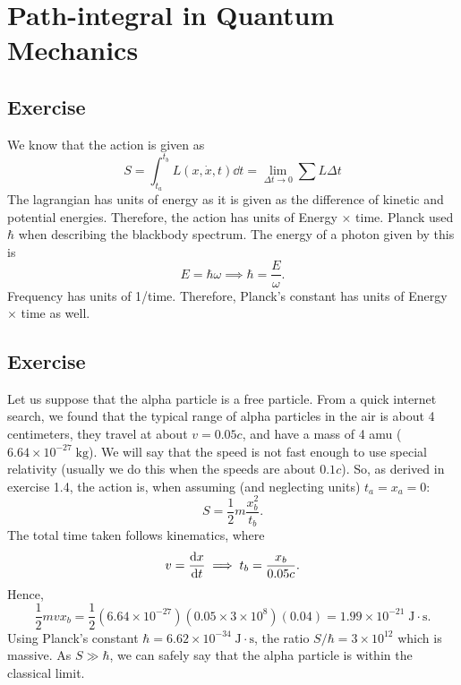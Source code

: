 \section{Path-integral in Quantum Mechanics}
\subsection{Exercise}
We know that the action is given as
\begin{equation}
    S = \int_{t_a}^{t_b}L(x, \dot x, t) \dd t = \lim_{\Delta t\to 0}\sum L \Delta t
\end{equation}
The lagrangian has units of energy as it is given as the difference of kinetic and potential energies. Therefore, the action has units of Energy $\times$ time. Planck used $\hbar$ when describing the blackbody spectrum. The energy of a photon given by this is
\begin{equation}
    E = \hbar \omega \implies \hbar = \frac{E}{\omega}.
\end{equation}
Frequency has units of 1/time. Therefore, Planck's constant has units of Energy $\times$ time as well. 
\subsection{Exercise}
Let us suppose that the alpha particle is a free particle. From a quick internet search, we found that the typical range of alpha particles in the air is about 4 centimeters, they travel at about $v = 0.05c$, and have a mass of 4 amu ($6.64\times 10^{-27}\;\mathrm{kg}$). We will say that the speed is not fast enough to use special relativity (usually we do this when the speeds are about $0.1c$). So, as derived in exercise 1.4, the action is, when assuming (and neglecting units) $t_a = x_a = 0$: 
\begin{equation}
    S = \frac{1}{2}m\frac{x_b^2}{t_b}.
\end{equation}
The total time taken follows kinematics, where 
\begin{equation}
    v = \dv{x}{t}\implies t_b = \frac{x_b}{0.05c}. 
\end{equation}
Hence, 
\begin{equation}
    \frac{1}{2}mv x_b = \frac{1}{2}(6.64\times 10^{-27}) (0.05 \times 3\times 10^8)(0.04) = 1.99\times 10^{-21}\;\mathrm{J\cdot s}.
\end{equation}
Using Planck's constant $\hbar = 6.62 \times 10^{-34}\;\mathrm{J\cdot s}$, the ratio $S/\hbar = 3\times 10^{12}$ which is massive. As $S \gg \hbar$, we can safely say that the alpha particle is within the classical limit. 


